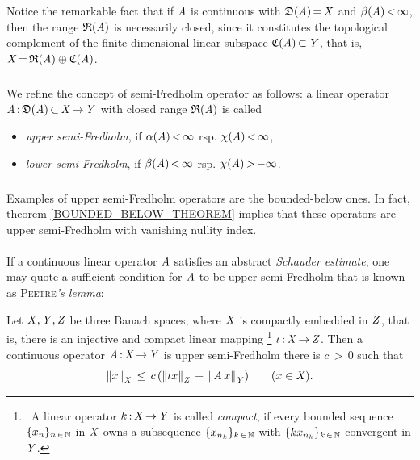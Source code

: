 \documentclass[11pt,twoside]{article}
\begin{document}
Notice the remarkable fact
that if $\mathit{A}$ is continuous with $\mathfrak{D}(\mathit{A}) {\,=\,} \mathit{X}$
and $\beta(\mathit{A}) {\,<\,} \infty$,
then the range $\mathfrak{R}(\mathit{A})$ is necessarily closed,
since it constitutes the topological complement
of the finite-dimensional linear subspace $\mathfrak{C}{(\mathit{A})} {\,\subset\,} \mathit{Y}$,
that is,
$\mathit{X} {\,=\,} \mathfrak{R}(\mathit{A}) \oplus \mathfrak{C}{(\mathit{A})}$.

\subparagraph{} %
We refine the concept of semi-Fredholm operator as follows:
a linear operator $\mathit{A} {\,:\,} \mathfrak{D}(\mathit{A}) {\,\subset\,} \mathit{X} {\,\to\,} \mathit{Y}$
with closed range $\mathfrak{R}(\mathit{A})$ is called

\begin{itemize}[leftmargin=12mm]
\item[(F-3)]
\textit{upper semi-Fredholm},
if $\alpha(\mathit{A}) {\,<\,} \infty$ rsp. $\chi(\mathit{A}) {\,<\,} \infty$,

\item[(F-4)]
\textit{lower semi-Fredholm},
if $\beta(\mathit{A}) {\,<\,} \infty$ rsp. $\chi(\mathit{A}) {\,>\,} {-}\infty$.
\end{itemize}

\subparagraph{} %
Examples of upper semi-Fredholm operators are the bounded-below ones.
In fact,
theorem \ref{BOUNDED_BELOW_THEOREM} implies that
these operators are upper semi-Fredholm with vanishing nullity index.

\paragraph{} %
If a continuous linear operator $\mathit{A}$ satisfies
an abstract \textit{Schauder estimate},
one may quote a sufficient condition for $\mathit{A}$ to be upper semi-Fredholm
that is known as \textsc{Peetre}\textit{'s lemma}:

\begin{theorem1}\label{PEETRE_THEOREM_II}
Let $\mathit{X}, \mathit{Y}, \mathit{Z}$ be three Banach spaces,
where $\mathit{X}$ is compactly embedded in $\mathit{Z}$,
that is,
there is an injective and compact linear mapping \footnote{
\,
A linear operator $k {\,:\,} \mathit{X} {\,\to\,} \mathit{Y}$ is called \textit{compact},
if every bounded sequence $\{x_n\}_{n {\,\in\,} {\mathbb{N}}}$ in $\mathit{X}$
owns a subsequence $\{x_{n_k}\}_{k {\,\in\,} {\mathbb{N}}}$
with $\{ k x_{n_k} \}_{k {\,\in\,} {\mathbb{N}}}$ convergent in $\mathit{Y}$.}
$\iota {\,:\,} \mathit{X} {\,\to\,} \mathit{Z}$.
Then a continuous operator $\mathit{A} {\,:\,} \mathit{X} {\,\to\,} \mathit{Y}$ is upper semi-Fredholm
\iff
there is $c {\,>\,} 0$ such that
\[
\left\lVert x \right\rVert_{\mathit{X}} \, \leq \,
c \, (\left\lVert \iota x \right\rVert_{\mathit{Z}} \,+\, \left\lVert \mathit{A} \,x \right\rVert_{\mathit{Y}})
\quad \quad (x \in \mathit{X}).
\]
\end{theorem1}
\end{document}
